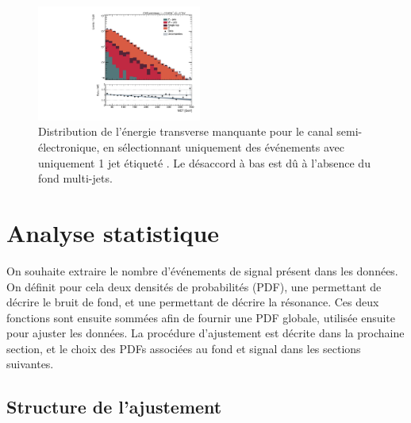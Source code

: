 \begin{figure}[tbp]
  \centering
  \includegraphics[width=0.48\textwidth,angle=-90,origin=c]{chapitre7/figs/data_mc/1btag/semie/hMET.pdf}
  \caption{Distribution de l'énergie transverse manquante pour le canal semi-électronique, en sélectionnant uniquement des événements avec uniquement 1 jet étiqueté \Pbottom. Le désaccord à bas \met est dû à l'absence du fond multi-jets.}
  \label{fig:data_mc_met}
\end{figure}

\section{Analyse statistique} \label{sec:stat}

On souhaite extraire le nombre d'événements de signal présent dans les données. On définit pour cela deux densités de probabilités (PDF), une permettant de décrire le bruit de fond, et une permettant de décrire la résonance. Ces deux fonctions sont ensuite sommées afin de fournir une PDF globale, utilisée ensuite pour ajuster les données. La procédure d'ajustement est décrite dans la prochaine section, et le choix des PDFs associées au fond et signal dans les sections suivantes.

\subsection{Structure de l'ajustement}

